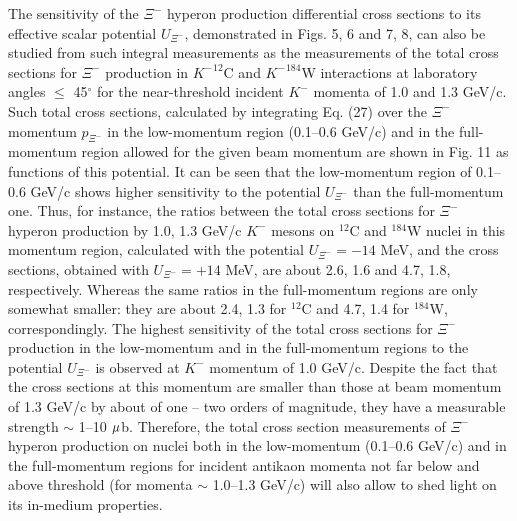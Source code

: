 \documentclass[12pt]{article}
\begin{document}
The sensitivity of the $\Xi^-$ hyperon production differential cross sections to
its effective scalar potential $U_{\Xi^-}$, demonstrated in Figs. 5, 6 and 7, 8, can also be studied from
such integral measurements as the measurements of the total cross sections for $\Xi^-$ production
in ${K^-}^{12}$C and  ${K^-}^{184}$W interactions at laboratory angles $\le$ 45$^{\circ}$
for the near-threshold incident $K^-$ momenta of 1.0 and 1.3 GeV/c.
Such total cross sections, calculated by integrating Eq. (27) over the $\Xi^-$ momentum $p_{\Xi^-}$
in the low-momentum region (0.1--0.6 GeV/c) and in the full-momentum region allowed for
the given beam momentum are shown in Fig. 11 as functions of this potential.
It can be seen that the low-momentum region of 0.1--0.6 GeV/c shows higher sensitivity
to the potential $U_{\Xi^-}$ than the full-momentum one.
Thus, for instance, the ratios between the total cross sections for $\Xi^-$ hyperon production by
1.0, 1.3 GeV/c $K^-$ mesons on $^{12}$C and $^{184}$W nuclei in this momentum region, calculated with
the potential $U_{\Xi^-}=-14$ MeV, and the cross sections, obtained with $U_{\Xi^-}=+14$ MeV, are
about 2.6, 1.6 and 4.7, 1.8, respectively.
Whereas the same ratios in the full-momentum regions are only somewhat smaller: they are about
2.4, 1.3 for $^{12}$C and 4.7, 1.4 for $^{184}$W, correspondingly.
The highest sensitivity of the total cross sections for $\Xi^-$ production
in the low-momentum and in the full-momentum regions
to the potential $U_{\Xi^-}$ is observed at $K^-$ momentum of 1.0 GeV/c.
Despite the fact that the cross sections at this momentum are smaller than those at beam
momentum of 1.3 GeV/c by about of one -- two orders of magnitude, they have a measurable strength
$\sim$ 1--10 ${\rm \mu}$b. Therefore, the total cross section measurements of $\Xi^-$ hyperon
production on nuclei both in the low-momentum (0.1--0.6 GeV/c) and in the full-momentum regions for
incident antikaon momenta not far below and above threshold
(for momenta $\sim$ 1.0--1.3 GeV/c) will also allow to shed light on its in-medium properties.
\end{document}
